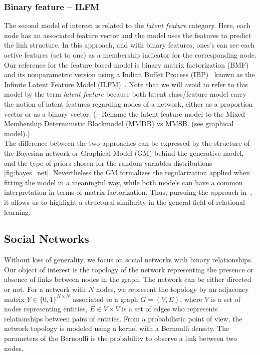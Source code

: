 \subsubsection{Binary feature -- ILFM}
The second model of interest is related to the \emph{latent feature} category. Here, each node has an associated feature vector and the model uses the features to predict the link structure. In this approach, and with binary features, ones's can see each active features (set to one) as a membership indicator for the corresponding node. Our reference for the feature based model is binary matrix factorization (BMF)~\cite{BMF} and its nonparametric version using a Indian Buffet Process (IBP)~\cite{IBP} known as the Infinite Latent Feature Model (ILFM)~\cite{ILFRM}. Note that we will avoid to refer to this model by the term \emph{latent feature} because both latent class/feature model carry the notion of latent features regarding nodes of a network, either as a proportion vector or as a binary vector.
(-- Rename the latent feature model to the Mixed Membership Deterministic Blockmodel (MMDB) vs MMSB. (see graphical model).)~\\

The difference between the two approaches can be expressed by the structure of the Bayesian network or Graphical Model (GM) behind the generative model, and the type of priors chosen for the random variables distributions \ref{fig:bayes_net}. Nevertheless the GM formalizes the regularization applied when fitting the model in a meaningful way, while both models can have a common interpretation in terms of matrix factorization. Thus, pursuing the approach in~\cite{DCA}, it allows us to highlight a structural similarity in the general field of relational learning.

\subsection{Social Networks}
Without loss of generality, we focus on social networks with binary relationships. Our object of interest is the topology of the network representing the presence or absence of links between nodes in the graph. The network can be either directed or not. For a network with $N$ nodes, we represent the topology by an adjacency matrix $Y \in \{0,1\}^{N\times N}$ associated to a graph $G = (V,E)$, where $V$ is a set of nodes representing entities, $E \in V \times V$ is a set of edges who represents relationships between pairs of entities. From a probabilistic point of view, the network topology is modeled using a kernel with a Bernoulli density. The parameters of the Bernoulli is the probability to observe a link between two nodes.

